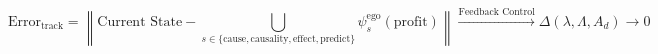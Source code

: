 \begin{equation}
    \tag{Track Servo}
    \text{Error}_{\mathrm{track}} = \left\| \text{Current State} - \bigcup_{s \in \{\mathrm{cause}, \mathrm{causality}, \mathrm{effect}, \mathrm{predict}\}} \psi^{\mathrm{ego}}_s(\mathrm{profit}) \right\| \xrightarrow{\text{Feedback Control}} \Delta (\lambda, \Lambda, A_d) \longrightarrow 0
\end{equation}


